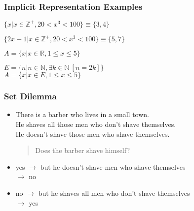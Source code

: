 \documentclass[dvipsnames]{beamer}
\begin{document}
\begin{frame}
  \frametitle{Implicit Representation Examples}

  \begin{example}
    $\{x | x \in \mathbb{Z}^+, 20 < x^3 < 100\} \equiv \{3,4\}$

    $\{2x-1 | x \in \mathbb{Z}^+, 20 < x^3 < 100\} \equiv \{5,7\}$
  \end{example}

  \pause
  \begin{example}
    $A = \{ x | x \in \mathbb{R}, 1 \leq x \leq 5 \}$
  \end{example}

  \pause
  \begin{example}
    $E = \{ n | n \in \mathbb{N}, \exists k \in \mathbb{N}~[n=2k] \}$\\
    $A = \{ x | x \in E, 1 \leq x \leq 5 \}$
  \end{example}
\end{frame}

\begin{frame}
  \frametitle{Set Dilemma}

  \begin{itemize}
    \item There is a barber who lives in a small town.\\
      He shaves all those men who don't shave themselves.\\
      He doesn't shave those men who shave themselves.

    \smallskip
    \begin{quote}
      Does the barber shave himself?
    \end{quote}

    \pause
    \item yes $\rightarrow$ but he doesn't shave men who shave themselves\\
      $\rightarrow$ no

    \pause
    \item no $\rightarrow$ but he shaves all men who don't shave themselves\\
      $\rightarrow$ yes
  \end{itemize}
\end{frame}
\end{document}
